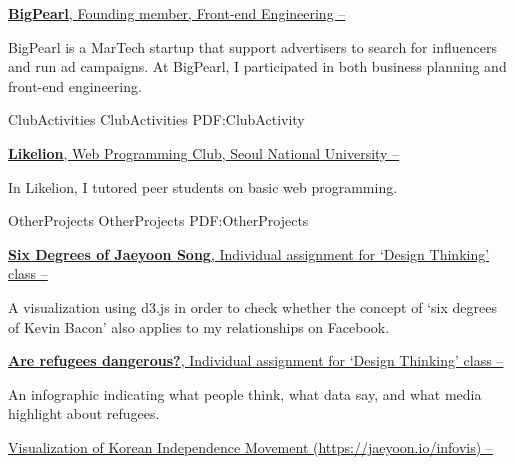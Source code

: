 \documentclass[letterpaper,MMMyyyy,nonstopmode]{template}
\begin{document}
\begin{Body}
\BigGap
\Entry
  \href{https://ad.bigpearl.io}
  {\textbf{BigPearl}, Founding member, Front-end Engineering
  \hfill
   --
  }
  \begin{Detail}
  \SubBulletItem
    BigPearl is a MarTech startup that support advertisers to search for influencers and run ad campaigns. \newline At BigPearl, I participated in both business planning and front-end engineering.
  \end{Detail}


\Section
{Club\newline Activities}
{Club\newline Activities}
{PDF:ClubActivity}

\BigGap
\Entry
  \href{https://likelion.net}
  {\textbf{Likelion}, Web Programming Club, Seoul National University
  \hfill
   --
  }

  \begin{Detail}
  \SubBulletItem
    In Likelion, I tutored peer students on basic web programming.
  \end{Detail}

\newpage
    
\Section
{Other\newline Projects}
{Other\newline Projects}
{PDF:OtherProjects}
  
\BigGap
\Entry
  \href{https://jaeyoon.io/dt4c}
  {\textbf{Six Degrees of Jaeyoon Song}, Individual assignment for `Design Thinking' class
  \hfill
   --
  }

  \begin{Detail}
  \SubBulletItem
    A visualization using d3.js in order to check whether the concept of `six degrees of Kevin Bacon' also applies to my relationships on Facebook.
  \end{Detail}

\BigGap
\Entry
  \href{https://jaeyoon.io/dt4c}
  {\textbf{Are refugees dangerous?}, Individual assignment for `Design Thinking' class
  \hfill
   --
  }

  \begin{Detail}
  \SubBulletItem
    An infographic indicating what people think, what data say, and what media highlight about refugees. 
  \end{Detail}

\BigGap
\BulletItem
\href{https://jaeyoon.io/infovis}
{Visualization of Korean Independence Movement (https://jaeyoon.io/infovis)
\hfill
{} --
}


\end{Body}
\end{document}
